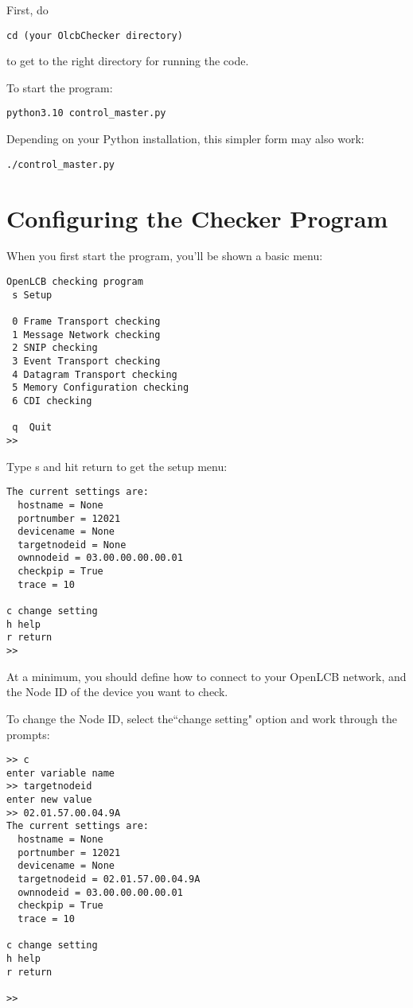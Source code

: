 First, do
\begin{verbatim}
cd (your OlcbChecker directory)
\end{verbatim}
to get to the right directory for running the code.

To start the program:
\begin{verbatim}
python3.10 control_master.py
\end{verbatim}

Depending on your Python installation, this simpler form may also work:
\begin{verbatim}
./control_master.py
\end{verbatim}


\section{Configuring the Checker Program}

When you first start the program, you'll be shown a basic menu:

\begin{verbatim}
OpenLCB checking program
 s Setup

 0 Frame Transport checking
 1 Message Network checking
 2 SNIP checking
 3 Event Transport checking
 4 Datagram Transport checking
 5 Memory Configuration checking
 6 CDI checking

 q  Quit
>>
\end{verbatim}

Type s and hit return to get the setup menu:

\begin{verbatim}
The current settings are:
  hostname = None
  portnumber = 12021
  devicename = None
  targetnodeid = None
  ownnodeid = 03.00.00.00.00.01
  checkpip = True
  trace = 10

c change setting
h help
r return
>>
\end{verbatim}

At a minimum, you should define how to connect to your OpenLCB network,
and the Node ID of the device you want to check.

To change the Node ID, select the``change setting" option and work through the prompts:

\begin{verbatim}
>> c
enter variable name
>> targetnodeid
enter new value
>> 02.01.57.00.04.9A
The current settings are:
  hostname = None
  portnumber = 12021
  devicename = None
  targetnodeid = 02.01.57.00.04.9A
  ownnodeid = 03.00.00.00.00.01
  checkpip = True
  trace = 10

c change setting
h help
r return

>>
\end{verbatim}

